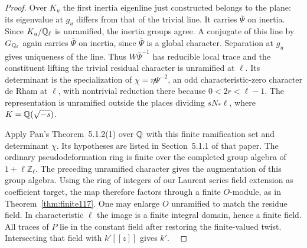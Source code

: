 \documentclass[a4paper,11pt]{article}
\theoremstyle{definition}
\theoremstyle{remark}
\newcommand{\ZZ}{\mathbb Z}\newcommand{\ord}{\operatorname{ord}}
\numberwithin{equation}{section}
\begin{document}
\begin{proof}
Over \(K_u\) the first inertia eigenline just constructed
belongs to the plane: its eigenvalue at \(g_u\) differs from
that of the trivial line. It carries \(\bar\Psi\) on inertia.
Since \(K_u/\mathbb Q_\ell\) is unramified, the inertia groups
agree. A conjugate of this line by \(G_{\mathbb Q_\ell}\) again
carries \(\bar\Psi\) on inertia, since \(\bar\Psi\) is a global
character. Separation at \(g_u\) gives uniqueness of the line.
Thus \(W\bar\Psi^{-1}\) has reducible local trace and the
constituent lifting the trivial residual character is
unramified at \(\ell\). Its determinant is the specialization
of \(\chi=\eta\Psi^{-2}\), an odd characteristic-zero character
de Rham at \(\ell\), with nontrivial reduction there because
\(0<2r<\ell-1\). The representation is unramified outside
the places dividing \(sN_*\ell\), where \(K=\mathbb Q(\sqrt{-s})\).

Apply Pan's Theorem~5.1.2(1) over \(\mathbb Q\) with this finite
ramification set and determinant \(\chi\). Its hypotheses
are listed in Section~5.1.1 of that paper. The ordinary
pseudodeformation ring is finite over the completed group
algebra of \(1+\ell\ZZ_\ell\). The preceding unramified
character gives the augmentation of this group algebra.
Using the ring of integers of our Laurent series field
extension as coefficient target, the map therefore factors
through a finite \(O\)-module, as in Theorem~\ref{thm:finite117}.
One may enlarge \(O\) unramified to match the residue field.
In characteristic \(\ell\) the image is a finite integral
domain, hence a finite field. All traces of \(P\) lie in
the constant field after restoring the finite-valued twist.
Intersecting that field with \(k'[[z]]\) gives \(k'\).
~\cite{VIII-VI-VI-pan40}
\end{proof}
\end{document}
